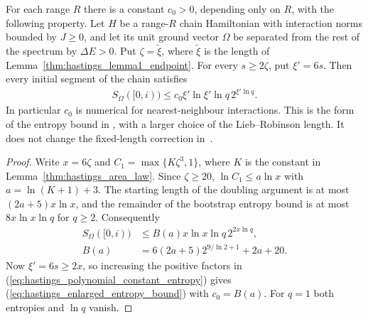 \begin{lemma}
    \label{thm:hastings_area_law_printed}
    \leanok
    For each range $R$ there is a constant $c_0>0$, depending only on $R$,
    with the following property. Let $H$ be a range-$R$ chain Hamiltonian
    with interaction norms bounded by $J\ge0$, and let its unit ground
    vector $\Omega$ be separated from the rest of the spectrum by
    $\Delta E>0$. Put $\zeta=\tilde\xi$, where $\tilde\xi$ is the length of
    Lemma~\ref{thm:hastings_lemma1_endpoint}. For every $s\ge2\zeta$, put
    $\xi'=6s$. Then every initial segment of the chain satisfies
    \begin{align}
        S_\Omega([0,i))
        \le c_0\xi'\ln\xi'\ln q\,2^{\xi'\ln q}.
        \label{eq:hastings_enlarged_entropy_bound}
    \end{align}
    In particular $c_0$ is numerical for nearest-neighbour interactions.
    This is the form of the entropy bound in
    \cite[lines 124--144]{Hastings2007AreaLaw}, with a larger choice of the
    Lieb--Robinson length. It does not change the fixed-length correction
    in~\cite{gap:hastings07_doubling_constants}.
\end{lemma}
\begin{proof}\leanok
    Write $x=6\zeta$ and $C_1=\max\{K\zeta^3,1\}$, where $K$ is the
    constant in Lemma~\ref{thm:hastings_area_law}. Since $\zeta\ge20$,
    $\ln C_1\le a\ln x$ with $a=\ln(K+1)+3$. The starting length of the
    doubling argument is at most $(2a+5)x\ln x$, and the remainder of the
    bootstrap entropy bound is at most $8x\ln x\ln q$ for $q\ge2$.
    Consequently
    \begin{align}
        S_\Omega([0,i)) & \le B(a)x\ln x\ln q\,2^{2x\ln q},
        \label{eq:hastings_polynomial_constant_entropy}
        \\
        B(a)            & =6(2a+5)2^{9/\ln2+1}+2a+20.
        \label{eq:hastings_entropy_numeric_constant}
    \end{align}
    Now $\xi'=6s\ge2x$, so increasing the positive factors in
    (\ref{eq:hastings_polynomial_constant_entropy}) gives
    (\ref{eq:hastings_enlarged_entropy_bound}) with $c_0=B(a)$. For $q=1$
    both entropies and $\ln q$ vanish.
\end{proof}

